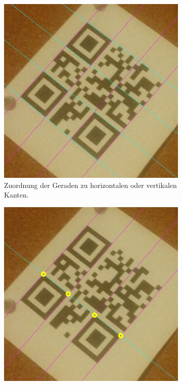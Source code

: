 \begin{figure}[t]
\centering
\begin{subfigure}[t]{0.3\textwidth}
\centering
\includegraphics[scale=0.25]{images/qrcode-adler-wand_6___SPLIT___0_.jpg}
\caption{Zuordnung der Geraden zu horizontalen oder vertikalen Kanten.}\label{fig:asign}
\end{subfigure}
\begin{subfigure}[t]{0.3\textwidth}
\centering
\includegraphics[scale=0.25]{images/qrcode-adler-wand_7___SORT___0_.jpg}

\end{subfigure}
\end{figure}
